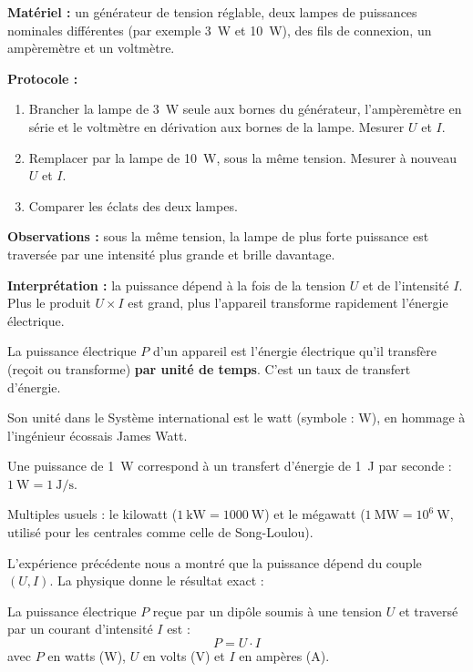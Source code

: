 \documentclass[11pt]{article}
\newcommand{\cle}[1]{{\popxbold\color{popdark}#1}}
\newcounter{popsec}
\newcounter{popsub}
\newcommand{\courssub}[1]{%
  \stepcounter{popsub}%
  \par\vspace{9pt}\noindent{\popxbold\fontsize{11.5}{13}\selectfont\color{popink}{\color{poporange}\thepopsec.\thepopsub}\hspace{6pt}#1}\par\nopagebreak\vspace{4pt}
}
\begin{document}
\begin{experience}
\textbf{Matériel :} un générateur de tension réglable, deux lampes de puissances nominales différentes (par exemple \SI{3}{W} et \SI{10}{W}), des fils de connexion, un ampèremètre et un voltmètre.\par
\textbf{Protocole :}
\begin{enumerate}
\item Brancher la lampe de \SI{3}{W} seule aux bornes du générateur, l'ampèremètre en série et le voltmètre en dérivation aux bornes de la lampe. Mesurer $U$ et $I$.
\item Remplacer par la lampe de \SI{10}{W}, sous la même tension. Mesurer à nouveau $U$ et $I$.
\item Comparer les éclats des deux lampes.
\end{enumerate}
\textbf{Observations :} sous la même tension, la lampe de plus forte puissance est traversée par une intensité plus grande et brille davantage.\par
\textbf{Interprétation :} la puissance dépend à la fois de la tension $U$ et de l'intensité $I$. Plus le produit $U \times I$ est grand, plus l'appareil transforme rapidement l'énergie électrique.
\end{experience}

\begin{definition}
La \cle{puissance électrique} $P$ d'un appareil est l'énergie électrique qu'il transfère (reçoit ou transforme) \textbf{par unité de temps}. C'est un taux de transfert d'énergie.\par
Son unité dans le Système international est le \cle{watt} (symbole : W), en hommage à l'ingénieur écossais James Watt.\par
Une puissance de \SI{1}{W} correspond à un transfert d'énergie de \SI{1}{J} par seconde : $1~\text{W} = 1~\text{J/s}$.\par
Multiples usuels : le kilowatt ($1~\text{kW} = 1000~\text{W}$) et le mégawatt ($1~\text{MW} = 10^{6}~\text{W}$, utilisé pour les centrales comme celle de Song-Loulou).
\end{definition}

\courssub{L'expression fondamentale : $P = U \cdot I$}

L'expérience précédente nous a montré que la puissance dépend du couple $(U, I)$. La physique donne le résultat exact :

\begin{propriete}
La puissance électrique $P$ reçue par un dipôle soumis à une tension $U$ et traversé par un courant d'intensité $I$ est :
\[ P = U \cdot I \]
avec $P$ en watts (W), $U$ en volts (V) et $I$ en ampères (A).
\end{propriete}
\end{document}
